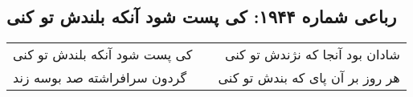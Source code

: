 \begin{center}
\section*{رباعی شماره ۱۹۴۴: کی پست شود آنکه بلندش تو کنی}
\label{sec:1944}
\begin{longtable}{l p{0.5cm} r}
کی پست شود آنکه بلندش تو کنی
&&
شادان بود آنجا که نژندش تو کنی
\\
گردون سرافراشته صد بوسه زند
&&
هر روز بر آن پای که بندش تو کنی
\\
\end{longtable}
\end{center}
